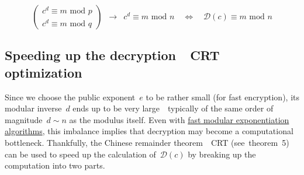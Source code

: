 \documentclass{article}
\begin{document}
\begin{equation*}
\begin{pmatrix}
c^d \equiv m\,\,\text{mod}\,\,p \\
c^d \equiv m\,\,\text{mod}\,\,q
\end{pmatrix} \,\,\, \rightarrow \,\,\, c^d \equiv m  \,\,\text{mod}\,\,n \quad \Longleftrightarrow \quad \mathcal{D}(c) \equiv m \,\,\text{mod}\,\,n
\end{equation*}

\subsection{Speeding up the decryption~\textemdash~CRT optimization} \label{crtOpt}

Since we choose the public exponent~$e$ to be rather small (for fast encryption), its modular inverse~$d$ ends up to be very large~\textemdash~typically of the same order of magnitude~$d \sim n$ as the modulus itself.  Even with \href{https://en.wikipedia.org/wiki/Modular_exponentiation}{fast modular exponentiation algorithms}, this imbalance implies that decryption may become a computational bottleneck.  Thankfully, the Chinese remainder theorem~\textemdash~CRT (see~theorem~5) can be used to speed up the calculation of~$\mathcal{D}(c)$ by breaking up the computation into two parts. \\ 
\end{document}
